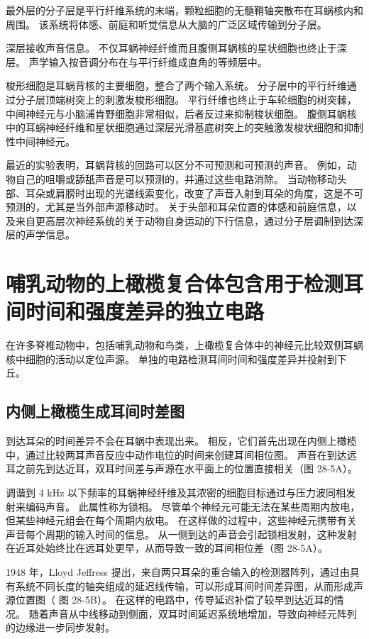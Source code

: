 最外层的分子层是平行纤维系统的末端，颗粒细胞的无髓鞘轴突散布在耳蜗核内和周围。 该系统将体感、前庭和听觉信息从大脑的广泛区域传输到分子层。

深层接收声音信息。 不仅耳蜗神经纤维而且腹侧耳蜗核的星状细胞也终止于深层。 声学输入按音调分布在与平行纤维成直角的等频层中。

梭形细胞是耳蜗背核的主要细胞，整合了两个输入系统。 分子层中的平行纤维通过分子层顶端树突上的刺激发梭形细胞。 平行纤维也终止于车轮细胞的树突棘，中间神经元与小脑浦肯野细胞非常相似，后者反过来抑制梭状细胞。 腹侧耳蜗核中的耳蜗神经纤维和星状细胞通过深层光滑基底树突上的突触激发梭状细胞和抑制性中间神经元。

最近的实验表明，耳蜗背核的回路可以区分不可预测和可预测的声音。 例如，动物自己的咀嚼或舔舐声音是可以预测的，并通过这些电路消除。 当动物移动头部、耳朵或肩膀时出现的光谱线索变化，改变了声音入射到耳朵的角度，这是不可预测的，尤其是当外部声源移动时。 关于头部和耳朵位置的体感和前庭信息，以及来自更高层次神经系统的关于动物自身运动的下行信息，通过分子层调制到达深层的声学信息。

\section{哺乳动物的上橄榄复合体包含用于检测耳间时间和强度差异的独立电路}
在许多脊椎动物中，包括哺乳动物和鸟类，上橄榄复合体中的神经元比较双侧耳蜗核中细胞的活动以定位声源。 单独的电路检测耳间时间和强度差异并投射到下丘。

\subsection{内侧上橄榄生成耳间时差图}
到达耳朵的时间差异不会在耳蜗中表现出来。 相反，它们首先出现在内侧上橄榄中，通过比较两耳声音反应中动作电位的时间来创建耳间相位图。 声音在到达远耳之前先到达近耳，双耳时间差与声源在水平面上的位置直接相关（图 28-5A）。

调谐到 4 kHz 以下频率的耳蜗神经纤维及其浓密的细胞目标通过与压力波同相发射来编码声音。 此属性称为锁相。 尽管单个神经元可能无法在某些周期内放电，但某些神经元组会在每个周期内放电。 在这样做的过程中，这些神经元携带有关声音每个周期的输入时间的信息。 从一侧到达的声音会引起锁相发射，这种发射在近耳处始终比在远耳处更早，从而导致一致的耳间相位差（图 28-5A）。


1948 年，Lloyd Jeffress 提出，来自两只耳朵的重合输入的检测器阵列，通过由具有系统不同长度的轴突组成的延迟线传输，可以形成耳间时间差异图，从而形成声源位置图（ 图 28-5B）。 在这样的电路中，传导延迟补偿了较早到达近耳的情况。 随着声音从中线移动到侧面，双耳时间延迟系统地增加，导致向神经元阵列的边缘进一步同步发射。


